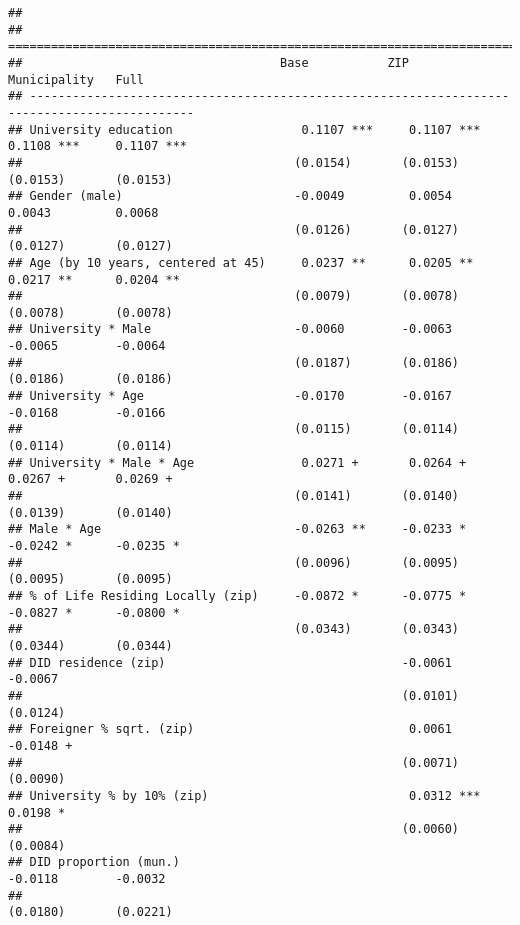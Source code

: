 \documentclass[
]{article}
\begin{document}
\begin{verbatim}
## 
## =============================================================================================
##                                    Base           ZIP            Municipality   Full         
## ---------------------------------------------------------------------------------------------
## University education                  0.1107 ***     0.1107 ***     0.1108 ***     0.1107 ***
##                                      (0.0154)       (0.0153)       (0.0153)       (0.0153)   
## Gender (male)                        -0.0049         0.0054         0.0043         0.0068    
##                                      (0.0126)       (0.0127)       (0.0127)       (0.0127)   
## Age (by 10 years, centered at 45)     0.0237 **      0.0205 **      0.0217 **      0.0204 ** 
##                                      (0.0079)       (0.0078)       (0.0078)       (0.0078)   
## University * Male                    -0.0060        -0.0063        -0.0065        -0.0064    
##                                      (0.0187)       (0.0186)       (0.0186)       (0.0186)   
## University * Age                     -0.0170        -0.0167        -0.0168        -0.0166    
##                                      (0.0115)       (0.0114)       (0.0114)       (0.0114)   
## University * Male * Age               0.0271 +       0.0264 +       0.0267 +       0.0269 +  
##                                      (0.0141)       (0.0140)       (0.0139)       (0.0140)   
## Male * Age                           -0.0263 **     -0.0233 *      -0.0242 *      -0.0235 *  
##                                      (0.0096)       (0.0095)       (0.0095)       (0.0095)   
## % of Life Residing Locally (zip)     -0.0872 *      -0.0775 *      -0.0827 *      -0.0800 *  
##                                      (0.0343)       (0.0343)       (0.0344)       (0.0344)   
## DID residence (zip)                                 -0.0061                       -0.0067    
##                                                     (0.0101)                      (0.0124)   
## Foreigner % sqrt. (zip)                              0.0061                       -0.0148 +  
##                                                     (0.0071)                      (0.0090)   
## University % by 10% (zip)                            0.0312 ***                    0.0198 *  
##                                                     (0.0060)                      (0.0084)   
## DID proportion (mun.)                                              -0.0118        -0.0032    
##                                                                    (0.0180)       (0.0221)   

\end{verbatim}
\end{document}
